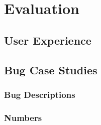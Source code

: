 \section{Evaluation}

\subsection{User Experience}


\subsection{Bug Case Studies}
\label{sec:eval-casestudy}

\subsubsection{Bug Descriptions}


\subsubsection{Numbers}
\label{sec:eval-numbers}

\newcommand\bugnum[2]{\textcolor{BrickRed}{{\bf #1} {\scriptsize \em (#2)}}}
\newcommand\nobugnum[2]{\textcolor{Blue}{{\em #1} {\scriptsize \em (#2)}}}


